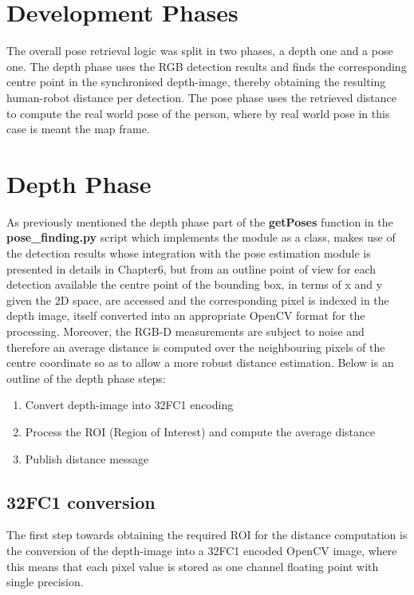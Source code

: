\section{Development Phases}

The overall pose retrieval logic was split in two phases, a depth one and a pose one. The depth phase uses the RGB detection results and finds the corresponding centre point in the synchronised depth-image, thereby obtaining the resulting human-robot distance per detection. The pose phase uses the retrieved distance to compute the real world pose of the person, where by real world pose in this case is meant the map frame.

\section{Depth Phase}

As previously mentioned the depth phase part of the \textbf{getPoses} function in the \textbf{pose\_finding.py} script which implements the module as a class, makes use of the detection results whose integration with the pose estimation module is presented in details in Chapter6, but from an outline point of view for each detection available the centre point of the bounding box, in terms of x and y given the 2D space, are accessed and the corresponding pixel is indexed in the depth image, itself converted into an appropriate OpenCV format for the processing. Moreover, the RGB-D measurements are subject to noise and therefore an average distance is computed over the neighbouring pixels of the centre coordinate so as to allow a more robust distance estimation. Below is an outline of the depth phase steps:

\begin{enumerate}
  \item Convert depth-image into 32FC1 encoding
  \item Process the ROI (Region of Interest) and compute the average distance
  \item Publish distance message
\end{enumerate}

\subsection{32FC1 conversion}

The first step towards obtaining the required ROI for the distance computation is the conversion of the depth-image into a 32FC1 encoded OpenCV image, where this means that each pixel value is stored as one channel floating point with single precision.

